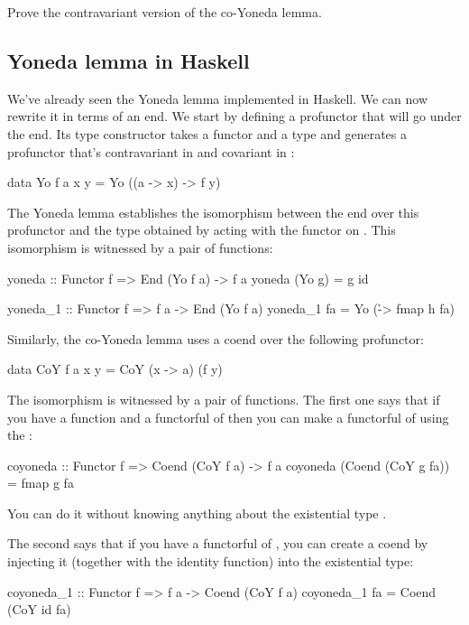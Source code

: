 \documentclass[DaoFP]{subfiles}
\begin{document}
\begin{exercise}
Prove the contravariant version of the co-Yoneda lemma.
\end{exercise}

\subsection{Yoneda lemma in Haskell}

We've already seen the Yoneda lemma implemented in Haskell. We can now rewrite it in terms of an end. We start by defining a profunctor that will go under the end. Its type constructor takes a functor  and a type  and generates a profunctor that's contravariant in  and covariant in :
\begin{haskell}
data Yo f a x y = Yo ((a -> x) -> f y)
\end{haskell}
The Yoneda lemma establishes the isomorphism between the end over this profunctor and the type obtained by acting with the functor   on . This isomorphism is witnessed by a pair of functions:
\begin{haskell}
yoneda :: Functor f => End (Yo f a) -> f a
yoneda (Yo g) = g id

yoneda_1 :: Functor f => f a -> End (Yo f a)
yoneda_1 fa = Yo (\h -> fmap h fa)
\end{haskell}

Similarly, the co-Yoneda lemma uses a coend over the following profunctor:
\begin{haskell}
data CoY f a x y = CoY (x -> a) (f y)
\end{haskell}
The isomorphism is witnessed by a pair of functions. The first one says that if you have a function  and a functorful of  then you can make a functorful of  using the :
\begin{haskell}
coyoneda :: Functor f => Coend (CoY f a) -> f a
coyoneda (Coend (CoY g fa)) = fmap g fa
\end{haskell}
You can do it without knowing anything about the existential type .

The second says that if you have a functorful of , you can create a coend by injecting it (together with the identity function) into the existential type:
\begin{haskell}
coyoneda_1 :: Functor f => f a -> Coend (CoY f a)
coyoneda_1 fa = Coend (CoY id fa)
\end{haskell}
\end{document}
